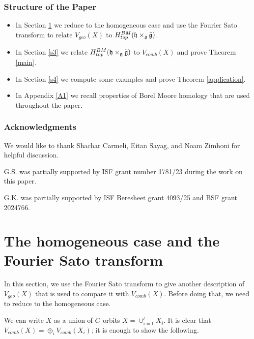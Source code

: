 \documentclass[12pt]{article}
\theoremstyle{plain}
\theoremstyle{definition}
\begin{document}
\subsubsection*{Structure of the Paper}
    \begin{itemize}
        \item In Section \ref{s2} we reduce to the homogeneous case and use the Fourier Sato transform to relate $V_{geo}(X)$ to $H^{BM}_{top}(\mathfrak{h}\times_{\mathfrak{g}}\Tilde{\mathfrak{g}})$. 

         \item  In Section \ref{s3} we relate $H^{BM}_{top}(\mathfrak{h}\times_{\mathfrak{g}}\Tilde{\mathfrak{g}})$ to $V_{comb}(X)$ and prove Theorem \ref{main}.

        \item  In Section \ref{s4} we compute some examples and prove Theorem \ref{application}.

        \item In Appendix \ref{A1} we recall properties of Borel Moore homology that are used throughout the paper.

    \end{itemize}

\subsubsection*{Acknowledgments}

We would like to thank Shachar Carmeli, Eitan Sayag, and Noam Zimhoni for helpful discussion.

G.S. was partially supported by ISF grant number 1781/23 during the work on this paper.

G.K. was partially supported by ISF Beresheet grant 4093/25 and BSF grant 2024766.

   
   



\section{The homogeneous case and the Fourier Sato transform}\label{s2}

In this section, we use the Fourier Sato transform to give another description of $V_{geo}(X)$ that is used to compare it with $V_{comb}(X)$. Before doing that, we need to reduce to the homogeneous case.

We can write $X$ as a union of $G$ orbits $X=\cup_{i=1}^l X_i$. It is clear that $V_{comb}(X)=\oplus_i V_{comb}(X_i)$; it is enough to show the following.
\end{document}
